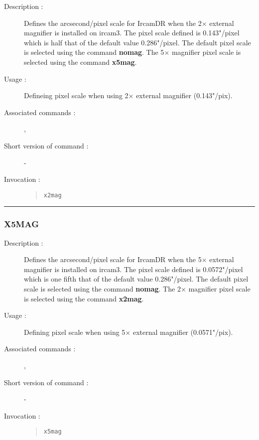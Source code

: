 \begin{description}

\item[Description :] Defines the arcsecond/pixel scale for {\sc
IrcamDR} when the 2$\times$ external magnifier is installed on {\sc
ircam3}.  The pixel scale defined is 0.143"/pixel which is half that of
the default value 0.286"/pixel.  The default pixel scale is selected
using the command {\bf nomag}.  The 5$\times$ magnifier pixel scale is
selected using the command {\bf x5mag}.

\item[Usage :] Defineing pixel scale when using 2$\times$ external magnifier
(0.143"/pix).
\item[Associated commands :] {\tt {}}, 
{\tt {}}
\item[Short version of command :] -
\item[Invocation :]

\begin{quote}{\tt  x2mag }\end{quote}

\end{description}

\hrule 
\subsubsection*{\label{X5MAG}X5MAG}

\begin{description}

\item[Description :] Defines the arcsecond/pixel scale for {\sc
IrcamDR} when the 5$\times$ external magnifier is installed on {\sc
ircam3}.  The pixel scale defined is 0.0572"/pixel which is one fifth
that of the default value 0.286"/pixel.  The default pixel scale is
selected using the command {\bf nomag}.  The 2$\times$ magnifier pixel
scale is selected using the command {\bf x2mag}.

\item[Usage :] Defining pixel scale when using 5$\times$ external magnifier
(0.0571"/pix).
\item[Associated commands :] {\tt {}}, 
{\tt {}}
\item[Short version of command :] -
\item[Invocation :]

\begin{quote}{\tt  x5mag }\end{quote}

\end{description}

